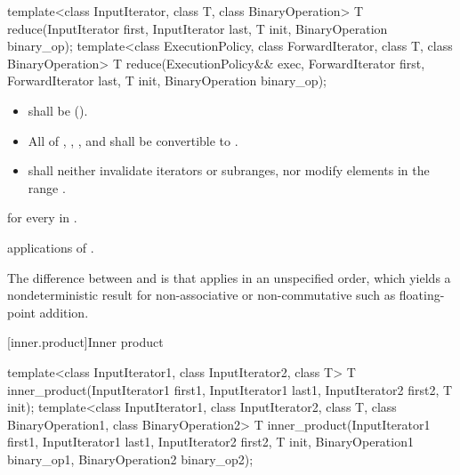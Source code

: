 %
\begin{itemdecl}
template<class InputIterator, class T, class BinaryOperation>
  T reduce(InputIterator first, InputIterator last, T init,
           BinaryOperation binary_op);
template<class ExecutionPolicy, class ForwardIterator, class T, class BinaryOperation>
  T reduce(ExecutionPolicy&& exec,
           ForwardIterator first, ForwardIterator last, T init,
           BinaryOperation binary_op);
\end{itemdecl}

\begin{itemdescr}
\pnum
\requires
\begin{itemize}
\item
   shall be  ().
\item
  All of , ,
  , and 
  shall be convertible to .
\item
   shall neither invalidate iterators or subranges,
  nor modify elements in the range .
\end{itemize}

\pnum
\returns
{}
for every  in .

\pnum
\complexity
{} applications of .

\pnum
\begin{note}
The difference between  and  is that
 applies  in an unspecified order,
which yields a nondeterministic result
for non-associative or non-commutative 
such as floating-point addition.
\end{note}
\end{itemdescr}

[inner.product]{Inner product}

%
\begin{itemdecl}
template<class InputIterator1, class InputIterator2, class T>
  T inner_product(InputIterator1 first1, InputIterator1 last1,
                  InputIterator2 first2, T init);
template<class InputIterator1, class InputIterator2, class T,
         class BinaryOperation1, class BinaryOperation2>
  T inner_product(InputIterator1 first1, InputIterator1 last1,
                  InputIterator2 first2, T init,
                  BinaryOperation1 binary_op1,
                  BinaryOperation2 binary_op2);
\end{itemdecl}

